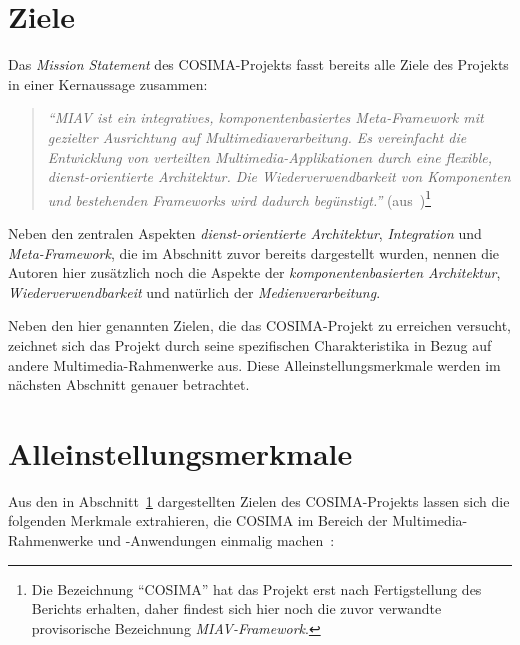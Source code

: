 \section{Ziele} %
\label{sec:ziele_cosima}

  Das \emph{Mission Statement} des COSIMA-Projekts fasst bereits alle Ziele des Projekts in einer Kernaussage zusammen:

  \begin{quote}
    \emph{``MIAV ist ein integratives, komponentenbasiertes Meta-Framework mit gezielter Ausrichtung auf Multimediaverarbeitung. Es vereinfacht die Entwicklung von verteilten Multimedia-Applikationen durch eine flexible, dienst-orientierte Architektur. Die Wiederverwendbarkeit von Komponenten und bestehenden Frameworks wird dadurch begünstigt.''} (aus~\citep[S. 2]{bericht})\footnote{Die Bezeichnung "`COSIMA"' hat das Projekt erst nach Fertigstellung des Berichts erhalten, daher findest sich hier noch die zuvor verwandte provisorische Bezeichnung \emph{MIAV-Framework}.}
  \end{quote}

  Neben den zentralen Aspekten \emph{dienst-orientierte Architektur}, \emph{Integration} und \emph{Meta-Framework}, die im Abschnitt zuvor bereits dargestellt wurden, nennen die Autoren hier zusätzlich noch die Aspekte der \emph{komponentenbasierten Architektur}, \emph{Wiederverwendbarkeit} und natürlich der \emph{Medienverarbeitung}.
  
  Neben den hier genannten Zielen, die das COSIMA-Projekt zu erreichen versucht, zeichnet sich das Projekt durch seine spezifischen Charakteristika in Bezug auf andere Multimedia-Rahmenwerke aus. Diese Alleinstellungsmerkmale werden im nächsten Abschnitt genauer betrachtet.



\section{Alleinstellungsmerkmale} %
\label{sec:alleinstellungsmerkmale}

  Aus den in Abschnitt~\ref{sec:ziele_cosima} dargestellten Zielen des COSIMA-Projekts lassen sich die folgenden Merkmale extrahieren, die COSIMA im Bereich der Multimedia-Rahmenwerke und -Anwendungen einmalig machen~\citep[S. 3f]{bericht}:
  
